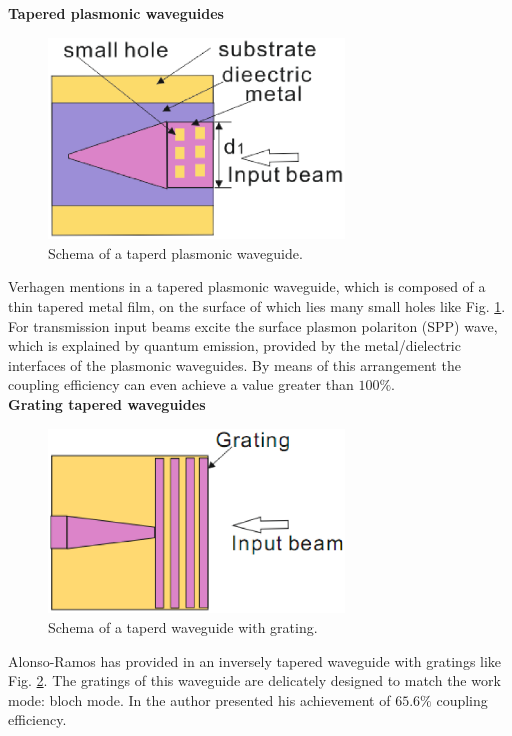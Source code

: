 \textbf{Tapered plasmonic waveguides}\\

\begin{figure}[!ht]
\centering
\includegraphics[width=0.7\textwidth]{bilder/tapered_waveguide_plasmonic}
\caption{Schema of a taperd plasmonic waveguide.}
\label{fig:tapered_waveguide_plasmonic}
\end{figure}
Verhagen mentions in \cite{tapered_plasmonic_waveguides} a tapered plasmonic waveguide, which is composed of a thin tapered metal film, on the surface of which lies many small holes like Fig. \ref{fig:tapered_waveguide_plasmonic}. For transmission input beams excite the surface plasmon polariton (SPP) wave, which is explained by quantum emission, provided by the metal/dielectric interfaces of the plasmonic waveguides. By means of this arrangement the coupling efficiency can even achieve a value greater than $100\%$. \\

\textbf{Grating tapered waveguides}\\

\begin{figure}[!ht]
\centering
\includegraphics[width=0.7\textwidth]{bilder/tapered_waveguide_grating}
\caption{Schema of a taperd waveguide with grating.}
\label{fig:tapered_waveguide_grating}
\end{figure}
Alonso-Ramos has provided in \cite{fiber_to_chip_grating_waveguides} an inversely tapered waveguide with gratings like Fig. \ref{fig:tapered_waveguide_grating}. The gratings of this waveguide are delicately designed to match the work mode: bloch mode. In \cite{fiber_to_chip_grating_waveguides} the author presented his achievement of $65.6\%$ coupling efficiency. \\
 
